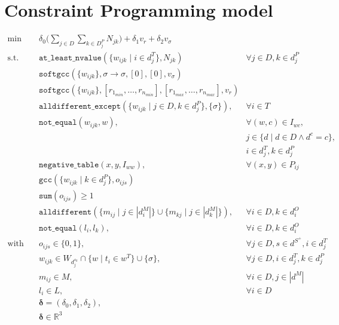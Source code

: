 \documentclass[../../thesis.tex]{subfiles}
\begin{document}
\chapter{Constraint Programming model}
 
\begin{align*}
  \text{min} \quad &\delta_0 \big( \sum_{j \in D} \sum_{k \in D^P_j} N_{jk} \big) + \delta_1 v_r + \delta_2 v_{\sigma} \\
  \text{s.t.} \quad &\texttt{at\_least\_nvalue}(\{ w_{ijk} \mid i \in d^T_j \}, N_{jk}) &\forall j \in D, k \in d^P_j \\
  &\texttt{softgcc}(\{ w_{ijk} \}, \sigma \rightarrow \sigma, [0], [0], v_{\sigma})  \\ 
  &\texttt{softgcc}(\{ w_{ijk} \}, [r_{1_{min}}, \dots, r_{n_{min}}], [r_{1_{max}}, \dots, r_{n_{max}}], v_{r}) \\
  &\texttt{alldifferent\_except}(\{w_{ijk} \mid j \in D, k \in d_j^P \}, \{ \sigma \}), &\forall i \in T \\ 
  &\texttt{not\_equal}(w_{ijk}, w), & \forall (w, c) \in I_{wc}, \\ 
  && j \in \{ d \mid d \in D \land d^c = c \}, \\
  && i \in d^T_j, k \in d_j^P \\
  &\texttt{negative\_table}(x, y, I_{ww}),  &\forall (x, y) \in P_{ij} \\ 
  &\texttt{gcc}(\{ w_{ijk} \mid k \in d^P_j \}, o_{ijs}) \\ 
  &\texttt{sum}(o_{ijs}) \geq 1 \\
  &\texttt{alldifferent}(\{ m_{ij} \mid j \in |d_i^M| \} \cup \{ m_{kj} \mid j \in |d_k^M| \}), &\forall i \in D, k \in d^O_i \\
  &\texttt{not_equal}(l_{i}, l_{k}), &\forall i \in D, k \in d^O_i \\
  \text{with} \quad & o_{ijs} \in \{ 0, 1 \}, & \forall j \in D, s \in d^{S^{+}}, i \in d^T_j \\ 
  &w_{ijk} \in W_{d^{s_k}_j} \cap \{ w \mid t_i \in w^T \} \cup \{ \sigma \},& \forall j \in D, i \in d^T_j, k \in d^P_j \\ 
  &m_{ij} \in M, & \forall i \in D, j \in |d^M| \\ 
  &l_{i} \in L, & \forall i \in D \\
  &\bm{\delta} = (\delta_0, \delta_1, \delta_2), \\
  &\bm{\delta} \in \mathbb{R}^3
\end{align*}
\end{document}
